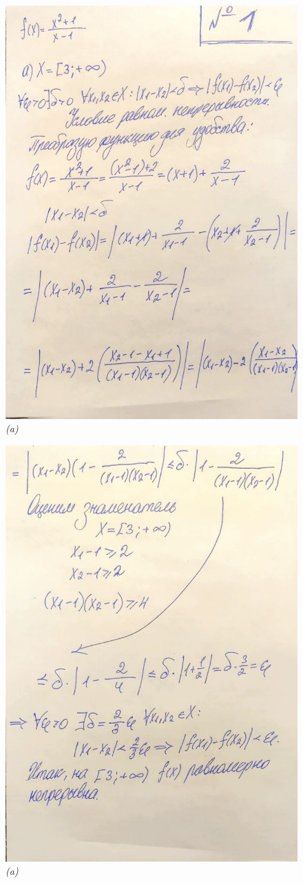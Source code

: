 \documentclass[a4paper,12pt]{article}
\begin{document}
\begin{figure}[H]
    \centering
    \includegraphics[width=0.8\linewidth]{img/1_1.jpg}
    \caption{\emph{(a)}}
    \label{fig:part1}
\end{figure}

\begin{figure}[H]
    \centering
    \includegraphics[width=0.8\linewidth]{img/1_2.jpg}
    \caption{\emph{(a)}}
    \label{fig:part2}
\end{figure}
\end{document}
